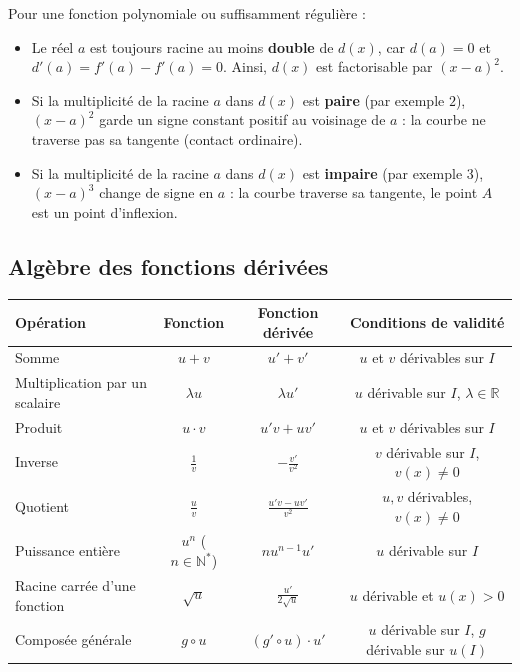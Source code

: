 \documentclass[11pt,a4paper]{article}
\newcommand{\N}{\mathbb{N}}
\newcommand{\R}{\mathbb{R}}
\begin{document}
\begin{theoremebox}
Pour une fonction polynomiale ou suffisamment régulière :
\begin{itemize}
    \item Le réel $a$ est toujours racine au moins \textbf{double} de $d(x)$, car $d(a) = 0$ et $d'(a) = f'(a) - f'(a) = 0$. Ainsi, $d(x)$ est factorisable par $(x-a)^2$.
    \item Si la multiplicité de la racine $a$ dans $d(x)$ est \textbf{paire} (par exemple $2$), $(x-a)^2$ garde un signe constant positif au voisinage de $a$ : la courbe ne traverse pas sa tangente (contact ordinaire).
    \item Si la multiplicité de la racine $a$ dans $d(x)$ est \textbf{impaire} (par exemple $3$), $(x-a)^3$ change de signe en $a$ : la courbe traverse sa tangente, le point $A$ est un point d'inflexion.
\end{itemize}
\end{theoremebox}

\subsection{Algèbre des fonctions dérivées}

\begin{center}
\renewcommand{\arraystretch}{1.4}
\begin{tabular}{|l|c|c|c|}
\hline
\textbf{Opération} & \textbf{Fonction} & \textbf{Fonction dérivée} & \textbf{Conditions de validité} \\
\hline
Somme & $u + v$ & $u' + v'$ & $u$ et $v$ dérivables sur $I$ \\
Multiplication par un scalaire & $\lambda u$ & $\lambda u'$ & $u$ dérivable sur $I$, $\lambda \in \R$ \\
Produit & $u \cdot v$ & $u' v + u v'$ & $u$ et $v$ dérivables sur $I$ \\
Inverse & $\frac{1}{v}$ & $-\frac{v'}{v^2}$ & $v$ dérivable sur $I$, $v(x) \neq 0$ \\
Quotient & $\frac{u}{v}$ & $\frac{u' v - u v'}{v^2}$ & $u, v$ dérivables, $v(x) \neq 0$ \\
Puissance entière & $u^n$ ($n \in \N^*$) & $n u^{n-1} u'$ & $u$ dérivable sur $I$ \\
Racine carrée d'une fonction & $\sqrt{u}$ & $\frac{u'}{2\sqrt{u}}$ & $u$ dérivable et $u(x) > 0$ \\
Composée générale & $g \circ u$ & $(g' \circ u) \cdot u'$ & $u$ dérivable sur $I$, $g$ dérivable sur $u(I)$ \\
\hline
\end{tabular}
\end{center}
\end{document}
